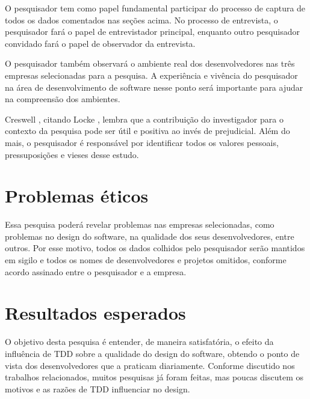 O pesquisador tem como papel fundamental participar do processo de captura de todos os dados comentados
nas seções acima. No processo de entrevista, o pesquisador fará o papel de entrevistador principal, enquanto outro
pesquisador convidado fará o papel de observador da entrevista.

O pesquisador também observará o ambiente real dos desenvolvedores nas três empresas selecionadas
para a pesquisa. A experiência e vivência do pesquisador na área de desenvolvimento de software 
nesse ponto será importante para ajudar na compreensão dos ambientes. 

Creswell \cite{creswell}, citando Locke \cite{locke}, lembra
que a contribuição do investigador para o contexto da pesquisa pode ser útil e positiva ao invés de prejudicial.
Além do mais, o pesquisador é responsável por identificar todos os valores pessoais, pressuposições e vieses desse estudo.

\section{Problemas éticos}
\label{sec:planejamento-etica}

Essa pesquisa poderá revelar problemas nas empresas selecionadas, como problemas no design do software, na
qualidade dos seus desenvolvedores, entre outros. Por esse motivo, todos os dados colhidos pelo pesquisador
serão mantidos em sigilo e todos os nomes de desenvolvedores e projetos omitidos, conforme acordo assinado entre o pesquisador e a empresa.


\section{Resultados esperados}
\label{sec:planejamento-resultados-esperados}

O objetivo desta pesquisa é entender, de maneira satisfatória, o efeito da influência de TDD sobre a qualidade
do design do software, obtendo o ponto de vista dos desenvolvedores que a praticam diariamente. 
Conforme discutido nos trabalhos relacionados, muitos pesquisas já foram feitas, 
mas poucas discutem os motivos e as razões de TDD influenciar no design.

